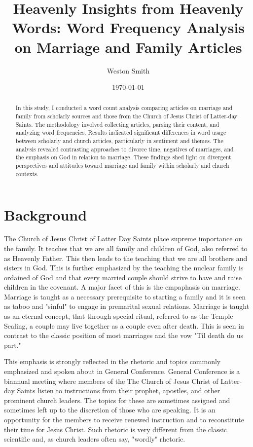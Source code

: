 \documentclass[twocolumn]{article}
\title{Heavenly Insights from Heavenly Words: Word Frequency Analysis on Marriage and Family Articles}
\author[1]{Weston Smith}
\affil{wms29@byu.edu}
\date{\today}
\begin{document}
\newcommand{\church}{The Church of Jesus Christ of Latter-day Saints }

\maketitle

\begin{abstract}
    In this study, I conducted a word count analysis comparing articles on marriage and family from scholarly sources and those from the Church of Jesus Christ of Latter-day Saints. 
    The methodology involved collecting articles, parsing their content, and analyzing word frequencies. Results indicated significant differences in word usage between scholarly and church articles, particularly in sentiment and themes. 
    The analysis revealed contrasting approaches to divorce time, negatives of marriages, and the emphasis on God in relation to marriage. These findings shed light on divergent perspectives and attitudes toward marriage and family within scholarly and church contexts.
\end{abstract}

\section{Background}
The Church of Jesus Christ of Latter Day Saints place supreme importance on the family. It teaches that we are all family and children of God, also referred to as Heavenly Father. 
This then leads to the teaching that we are all brothers and sisters in God. This is further emphasized by the teaching the nuclear family is ordained of God and that every married couple should strive to have and raise children in the covenant. 
A major facet of this is the empaphasis on marriage. Marriage is taught as a necessary prerequisite to starting a family and it is seen as taboo and "sinful" to engage in premarital sexual relations. Marriage is taught as an eternal concept, that through special ritual, referred to as the Temple Sealing, a couple may live together as a couple even after death. This is seen in contrast to the classic position of most marriages and the vow "Til death do us part."

This emphasis is strongly reflected in the rhetoric and topics commonly emphasized and spoken about in General Conference. General Conference is a biannual meeting where members of the \church listen to instructions from their prophet, apostles, and other prominent church leaders. The topics for these are sometimes assigned and sometimes left up to the discretion of those who are speaking. It is an opportunity for the members to receive renewed instruction and to reconstitute their time for Jesus Christ. Such rhetoric is very different from the classic scientific and, as church leaders often say, "wordly" rhetoric.
\end{document}
